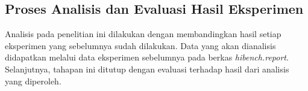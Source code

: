 \subsection{Proses Analisis dan Evaluasi Hasil Eksperimen}
Analisis pada penelitian ini dilakukan dengan membandingkan hasil setiap eksperimen yang sebelumnya sudah dilakukan. Data yang akan dianalisis didapatkan melalui data eksperimen sebelumnya pada berkas \textit{hibench.report}. Selanjutnya, tahapan ini ditutup dengan evaluasi terhadap hasil dari analisis yang diperoleh.








